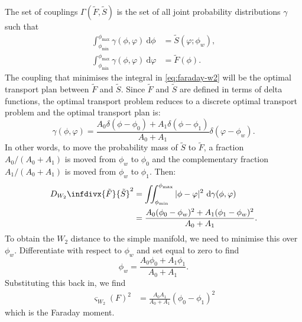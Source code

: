     The set of couplings $\Gamma(\tilde F, \tilde S)$ is the set of all joint probability distributions $\gamma$ such that
    \begin{align}
      \int_{\phi_{\min}}^{\phi_{\max}} \gamma(\phi, \varphi)\ \mathrm{d}\phi &= \tilde S(\varphi; \phi_w),\\
      \int_{\phi_{\min}}^{\phi_{\max}} \gamma(\phi, \varphi)\ \mathrm{d}\varphi &= \tilde F(\phi).
    \end{align}
    The coupling that minimises the integral in \autoref{eq:faraday-w2} will be the optimal transport plan between $\tilde F$ and $\tilde S$. Since $\tilde F$ and $\tilde S$ are defined in terms of delta functions, the optimal transport problem reduces to a discrete optimal transport problem and the optimal transport plan is:
    \begin{equation}
      \gamma(\phi, \varphi) = \frac{A_0 \delta(\phi - \phi_0) + A_1 \delta(\phi - \phi_1)}{A_0 + A_1} \delta(\varphi - \phi_w).
    \end{equation}
    In other words, to move the probability mass of $\tilde S$ to $\tilde F$, a fraction $A_0/(A_0 + A_1)$ is moved from $\phi_w$ to $\phi_0$ and the complementary fraction $A_1/(A_0 + A_1)$ is moved from $\phi_w$ to $\phi_1$. Then:
    \begin{align}
      D_{W_2}\infdivx{\tilde F}{\tilde S}^2 &= \iint_{\phi_{\min}}^{\phi_{\max}} |\phi - \varphi|^2\ \mathrm{d}\gamma(\phi, \varphi)\\
        &= \frac{A_0 (\phi_0 - \phi_w)^2 + A_1 (\phi_1 - \phi_w)^2}{A_0 + A_1}.
    \end{align}
    To obtain the $W_2$ distance to the simple manifold, we need to minimise this over $\phi_w$. Differentiate with respect to $\phi_w$ and set equal to zero to find
    \begin{equation}
      \phi_w = \frac{A_0 \phi_0 + A_1 \phi_1}{A_0 + A_1}.
    \end{equation}
    Substituting this back in, we find
    \begin{align}
      \varsigma_{W_2}(F)^2 &= \frac{A_0 A_1}{A_0 + A_1}(\phi_0 - \phi_1)^2
    \end{align}
    which is the Faraday moment.

